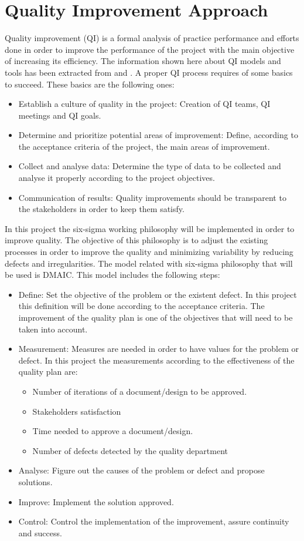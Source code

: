 \section{Quality Improvement Approach}
Quality improvement (QI) is a formal analysis of practice performance and efforts done in order to improve the performance of the project with the main objective of increasing its efficiency. The information shown here about QI models and tools has been extracted from \cite{aafp} and \cite{leansolutions}. A proper QI process requires of some basics to succeed. These basics are the following ones:
\begin{itemize}
\item Establish a culture of quality in the project: Creation of QI teams, QI meetings and QI goals.
\item Determine and prioritize potential areas of improvement: Define, according to the acceptance criteria of the project, the main areas of improvement.
\item Collect and analyse data: Determine the type of data to be collected and analyse it properly according to the project objectives.
\item Communication of results: Quality improvements should be transparent to the stakeholders in order to keep them satisfy. 
\end{itemize}
In this project the six-sigma working philosophy will be implemented in order to improve quality. The objective of this philosophy is to adjust the existing processes in order to improve the quality and minimizing variability by reducing defects and irregularities. The model related with six-sigma philosophy that will be used is DMAIC. This model includes the following steps:
\begin{itemize}
\item Define: Set the objective of the problem or the existent defect. In this project this definition will be done according to the acceptance criteria. The improvement of the quality plan is one of the objectives that will need to be taken into account.
\item Measurement: Measures are needed in order to have values for the problem or defect. In this project the measurements according to the effectiveness of the quality plan are:
\begin{itemize}
\item Number of iterations of a document/design to be approved.
\item Stakeholders satisfaction
\item Time needed to approve a document/design.
\item Number of defects detected by the quality department
\end{itemize}
\item Analyse: Figure out the causes of the problem or defect and propose solutions.
\item Improve: Implement the solution approved.
\item Control: Control the implementation of the improvement, assure continuity and success.
\end{itemize}
